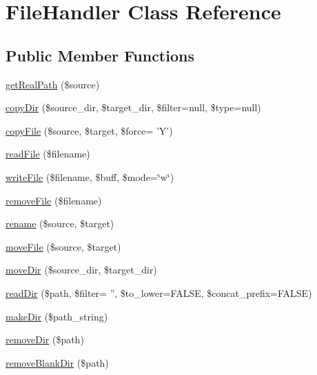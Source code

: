 \hypertarget{classFileHandler}{\section{File\+Handler Class Reference}
\label{classFileHandler}
}
\subsection*{Public Member Functions}
\begin{DoxyCompactItemize}
\item 
\hyperlink{classFileHandler_a6370b3eeddb705be04d9f60902a746e0}{get\+Real\+Path} (\$source)
\item 
\hyperlink{classFileHandler_a01289213af2a57f07018e7a84c8b9e87}{copy\+Dir} (\$source\+\_\+dir, \$target\+\_\+dir, \$filter=null, \$type=null)
\item 
\hyperlink{classFileHandler_a60d38b90a939a687ca5fde243936ff79}{copy\+File} (\$source, \$target, \$force= 'Y')
\item 
\hyperlink{classFileHandler_ac0bd2431461ad2bc04c093bfbb826bea}{read\+File} (\$filename)
\item 
\hyperlink{classFileHandler_ad90c10a81460f437bc68952427606155}{write\+File} (\$filename, \$buff, \$mode=\char`\"{}w\char`\"{})
\item 
\hyperlink{classFileHandler_aa5969f9fe0ce869fc736c4da384959e9}{remove\+File} (\$filename)
\item 
\hyperlink{classFileHandler_abfeaad5fe3c937fdbfed73f2138b3d48}{rename} (\$source, \$target)
\item 
\hyperlink{classFileHandler_aa558697af5a900f8594e1013f8d8b2c8}{move\+File} (\$source, \$target)
\item 
\hyperlink{classFileHandler_acb0c863aeb4f29a5ee89eb8f47d576ca}{move\+Dir} (\$source\+\_\+dir, \$target\+\_\+dir)
\item 
\hyperlink{classFileHandler_a02d0cada88becf977968d961df2f864b}{read\+Dir} (\$path, \$filter= '', \$to\+\_\+lower=F\+A\+L\+S\+E, \$concat\+\_\+prefix=F\+A\+L\+S\+E)
\item 
\hyperlink{classFileHandler_a9c2502d10c34a3996f1d6927624a7824}{make\+Dir} (\$path\+\_\+string)
\item 
\hyperlink{classFileHandler_a55015d030d3773d96281b0fa4bda986e}{remove\+Dir} (\$path)
\item 
\hyperlink{classFileHandler_a538bfd50008250786985c7da4ff768f1}{remove\+Blank\+Dir} (\$path)
\item 

\end{DoxyCompactItemize}
